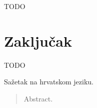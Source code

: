 \documentclass[times, utf8, zavrsni, numeric]{fer}
\begin{document}
TODO

\chapter{Zaključak}
TODO




\begin{sazetak}
Sažetak na hrvatskom jeziku.

\end{sazetak}

\begin{abstract}
Abstract.

\end{abstract}
\end{document}
